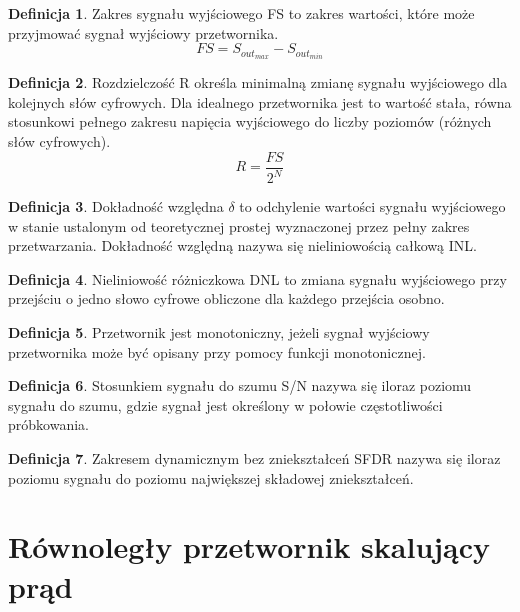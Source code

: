 \documentclass[10pt,a4paper,twoside]{report}
\theoremstyle{definition}
\theoremstyle{definition}
\newtheorem{definition}{Definicja}[section]
\theoremstyle{definition}
\theoremstyle{definition}
\theoremstyle{definition}
\begin{document}
{	\begin{definition}{Zakres sygnału wyjściowego FS to zakres wartości, które może przyjmować sygnał wyjściowy przetwornika.}
		\begin{equation}
		FS = S_{out_{max}} - S_{out_{min}}
		\end{equation}
	\end{definition}
	
	\begin{definition}{Rozdzielczość R określa minimalną zmianę sygnału wyjściowego dla kolejnych słów cyfrowych. Dla idealnego przetwornika jest to wartość stała, równa stosunkowi pełnego zakresu napięcia wyjściowego do liczby poziomów (różnych słów cyfrowych). }
		\begin{equation}
		R = \frac{FS}{2^{N}}		
		\end{equation}
	\end{definition}
	
	\begin{definition}{Dokładność względna $\delta$ to odchylenie wartości sygnału wyjściowego w stanie ustalonym od teoretycznej prostej wyznaczonej przez pełny zakres przetwarzania. Dokładność względną nazywa się nieliniowością całkową INL.}	
	\end{definition}
	
	\begin{definition}{Nieliniowość różniczkowa DNL to zmiana sygnału wyjściowego przy przejściu o jedno słowo cyfrowe obliczone dla każdego przejścia osobno. }
	\end{definition}	
	
	\begin{definition}{Przetwornik jest monotoniczny, jeżeli sygnał wyjściowy przetwornika może być opisany przy pomocy funkcji monotonicznej.}
	\end{definition}
	
	\begin{definition}{Stosunkiem sygnału do szumu S/N nazywa się iloraz poziomu sygnału do szumu, gdzie sygnał jest określony w połowie częstotliwości próbkowania.}
	\end{definition}

	\begin{definition}{Zakresem dynamicznym bez zniekształceń SFDR nazywa się iloraz poziomu sygnału do poziomu największej składowej zniekształceń.}
	\end{definition}
	\section{Równoległy przetwornik skalujący prąd}
	
}
\end{document}
